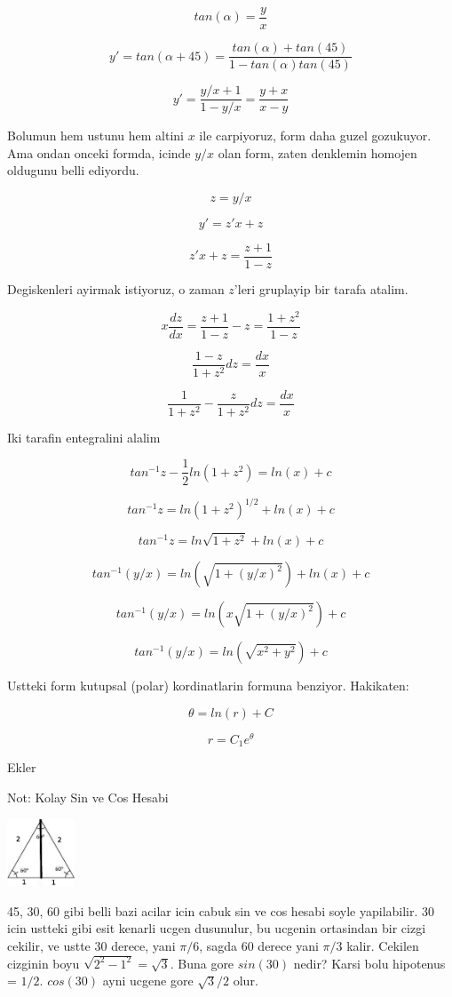 \documentclass[12pt,fleqn]{article}
\begin{document}
\[ tan (\alpha) = \frac{y}{x} \]

\[ y' = tan(\alpha + 45) = \frac{tan(\alpha) + tan(45)}{1 - tan(\alpha)tan(45)} \]

\[ y' = \frac{y/x + 1}{1-y/x} =  \frac{y+x}{x-y} \]

Bolumun hem ustunu hem altini $x$ ile carpiyoruz, form daha guzel
gozukuyor. Ama ondan onceki formda, icinde $y/x$ olan form, zaten
denklemin homojen oldugunu belli ediyordu. 

\[ z = y/x \]

\[ y' = z'x + z \]

\[ z'x +z = \frac{z+1}{1-z} \]

Degiskenleri ayirmak istiyoruz, o zaman $z$'leri gruplayip bir tarafa
atalim. 

\[ x \frac{dz}{dx} = \frac{z+1}{1-z} - z = \frac{1+z^2}{1-z} \]

\[ \frac{1-z}{1+z^2}dz = \frac{dx}{x} \]

\[ \frac{1}{1+z^2} - \frac{z}{1+z^2} dz = \frac{dx}{x} \]


Iki tarafin entegralini alalim

\[ tan^{-1}z - \frac{1}{2} ln (1+z^2) = ln(x) + c \]

\[ tan^{-1}z = ln (1+z^2)^{1/2} + ln(x) + c \]

\[ tan^{-1}z = ln \sqrt{1+z^2} + ln(x) + c \]

\[ tan^{-1}(y/x) = ln (\sqrt{1+(y/x)^2}) + ln(x) + c \]

\[ tan^{-1}(y/x) = ln(x \sqrt{1+(y/x)^2}) + c \]

\[ tan^{-1}(y/x) = ln(\sqrt{x^2+y^2}) + c \]

Ustteki form kutupsal (polar) kordinatlarin formuna benziyor. Hakikaten:

\[ \theta = ln(r) + C \]

\[ r = C_1e^{\theta} \]

Ekler

Not: Kolay Sin ve Cos Hesabi

\includegraphics[height=2cm]{4_3.png}

45, 30, 60 gibi belli bazi acilar icin cabuk sin ve cos hesabi soyle
yapilabilir. 30 icin ustteki gibi esit kenarli ucgen dusunulur, bu ucgenin
ortasindan bir cizgi cekilir, ve ustte 30 derece, yani $\pi/6$, sagda 60
derece yani $\pi/3$ kalir. Cekilen cizginin boyu $\sqrt{2^2 - 1^2} =
\sqrt{3}$. Buna  gore $sin(30)$ nedir? Karsi bolu hipotenus = $1/2$. $cos(30)$ ayni ucgene 
gore $\sqrt{3}/2$ olur.
\end{document}

